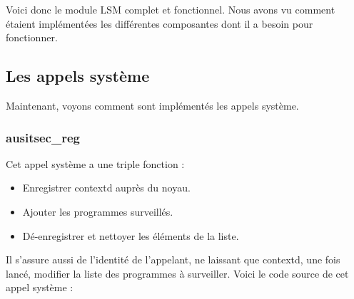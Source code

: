 \documentclass[pdftex,a4paper,titlepage,11pt]{article}
\begin{document}
Voici donc le module LSM complet et fonctionnel. Nous avons vu comment étaient implémentées les différentes composantes dont il a besoin pour fonctionner.

\subsection{Les appels système}

Maintenant, voyons comment sont implémentés les appels système.

\subsubsection{ausitsec\_reg}

Cet appel système a une triple fonction :
\begin{itemize}
	\item Enregistrer contextd auprès du noyau.
	\item Ajouter les programmes surveillés.
	\item Dé-enregistrer et nettoyer les éléments de la liste. 
\end{itemize}

Il s'assure aussi de l'identité de l'appelant, ne laissant que contextd, une fois lancé, modifier la liste des programmes à surveiller. Voici le code source de cet appel système :
\end{document}
